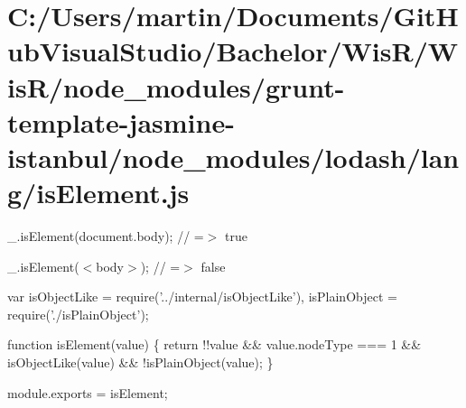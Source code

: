 \hypertarget{_c_1_2_users_2martin_2_documents_2_git_hub_visual_studio_2_bachelor_2_wis_r_2_wis_r_2node_module1c6630a91b17860745665c073ae9b9ce}{}\section{C\+:/\+Users/martin/\+Documents/\+Git\+Hub\+Visual\+Studio/\+Bachelor/\+Wis\+R/\+Wis\+R/node\+\_\+modules/grunt-\/template-\/jasmine-\/istanbul/node\+\_\+modules/lodash/lang/is\+Element.\+js}
\+\_\+.\+is\+Element(document.\+body); // =$>$ true

\+\_\+.\+is\+Element(\textquotesingle{}$<$body$>$\textquotesingle{}); // =$>$ false


\begin{DoxyCodeInclude}
var isObjectLike = require(\textcolor{stringliteral}{'../internal/isObjectLike'}),
    isPlainObject = require(\textcolor{stringliteral}{'./isPlainObject'});

\textcolor{keyword}{function} isElement(value) \{
  \textcolor{keywordflow}{return} !!value && value.nodeType === 1 && isObjectLike(value) && !isPlainObject(value);
\}

module.exports = isElement;
\end{DoxyCodeInclude}
 